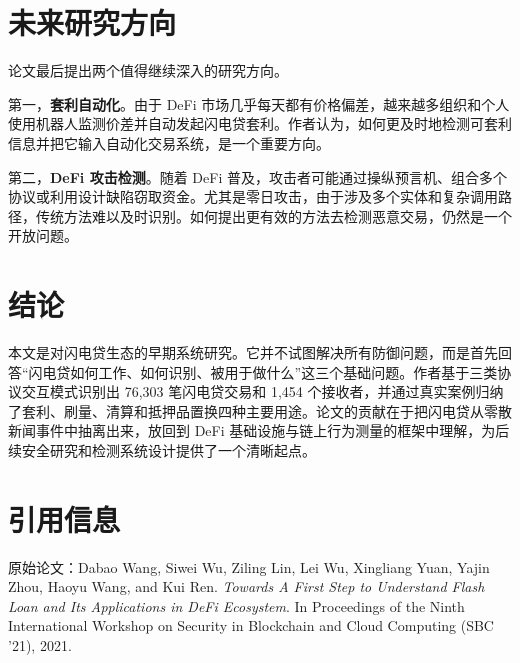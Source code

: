 \documentclass[UTF8,11pt]{ctexart}
\begin{document}
\section{未来研究方向}
论文最后提出两个值得继续深入的研究方向。

第一，\textbf{套利自动化}。由于 DeFi 市场几乎每天都有价格偏差，越来越多组织和个人使用机器人监测价差并自动发起闪电贷套利。作者认为，如何更及时地检测可套利信息并把它输入自动化交易系统，是一个重要方向。

第二，\textbf{DeFi 攻击检测}。随着 DeFi 普及，攻击者可能通过操纵预言机、组合多个协议或利用设计缺陷窃取资金。尤其是零日攻击，由于涉及多个实体和复杂调用路径，传统方法难以及时识别。如何提出更有效的方法去检测恶意交易，仍然是一个开放问题。

\section{结论}
本文是对闪电贷生态的早期系统研究。它并不试图解决所有防御问题，而是首先回答“闪电贷如何工作、如何识别、被用于做什么”这三个基础问题。作者基于三类协议交互模式识别出 76,303 笔闪电贷交易和 1,454 个接收者，并通过真实案例归纳了套利、刷量、清算和抵押品置换四种主要用途。论文的贡献在于把闪电贷从零散新闻事件中抽离出来，放回到 DeFi 基础设施与链上行为测量的框架中理解，为后续安全研究和检测系统设计提供了一个清晰起点。

\section*{引用信息}
原始论文：Dabao Wang, Siwei Wu, Ziling Lin, Lei Wu, Xingliang Yuan, Yajin Zhou, Haoyu Wang, and Kui Ren. \textit{Towards A First Step to Understand Flash Loan and Its Applications in DeFi Ecosystem}. In Proceedings of the Ninth International Workshop on Security in Blockchain and Cloud Computing (SBC '21), 2021.
\end{document}
